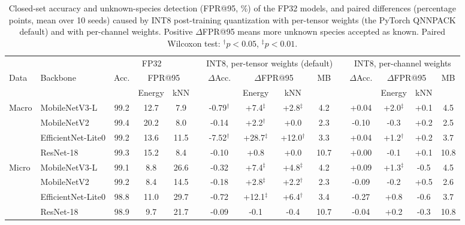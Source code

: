 \begin{table}[t]
\centering
\caption{Closed-set accuracy and unknown-species detection (FPR@95, \%) of the FP32 models, and paired differences (percentage points, mean over 10 seeds) caused by INT8 post-training quantization with per-tensor weights (the PyTorch QNNPACK default) and with per-channel weights. Positive $\Delta$FPR@95 means more unknown species accepted as known. Paired Wilcoxon test: $^{\dagger}p<0.05$, $^{\ddagger}p<0.01$.}
\label{tab:main}
\setlength{\tabcolsep}{3.2pt}
\footnotesize
\begin{tabular}{ll ccc c cccc c cccc}
\toprule
 & & \multicolumn{3}{c}{FP32} & & \multicolumn{4}{c}{INT8, per-tensor weights (default)} & & \multicolumn{4}{c}{INT8, per-channel weights} \\
\cmidrule(lr){3-5}\cmidrule(lr){7-10}\cmidrule(lr){12-15}
Data & Backbone & Acc. & \multicolumn{2}{c}{FPR@95} & & $\Delta$Acc. & \multicolumn{2}{c}{$\Delta$FPR@95} & MB & & $\Delta$Acc. & \multicolumn{2}{c}{$\Delta$FPR@95} & MB \\
 & & & Energy & kNN & & & Energy & kNN & & & & Energy & kNN & \\
\midrule
Macro & MobileNetV3-L & 99.2 & 12.7 & 7.9 &  & -0.79$^{\dagger}$ & +7.4$^{\ddagger}$ & +2.8$^{\ddagger}$ & 4.2 &  & +0.04 & +2.0$^{\ddagger}$ & +0.1 & 4.5 \\
 & MobileNetV2 & 99.4 & 20.2 & 8.0 &  & -0.14 & +2.2$^{\dagger}$ & +0.0 & 2.3 &  & -0.10 & -0.3 & +0.2 & 2.5 \\
 & EfficientNet-Lite0 & 99.2 & 13.6 & 11.5 &  & -7.52$^{\dagger}$ & +28.7$^{\ddagger}$ & +12.0$^{\dagger}$ & 3.3 &  & +0.04 & +1.2$^{\dagger}$ & +0.2 & 3.7 \\
 & ResNet-18 & 99.3 & 15.2 & 8.4 &  & -0.10 & +0.8 & +0.0 & 10.7 &  & +0.00 & -0.1 & +0.1 & 10.8 \\
\midrule
Micro & MobileNetV3-L & 99.1 & 8.8 & 26.6 &  & -0.32 & +7.4$^{\ddagger}$ & +4.8$^{\ddagger}$ & 4.2 &  & +0.09 & +1.3$^{\ddagger}$ & -0.5 & 4.5 \\
 & MobileNetV2 & 99.2 & 8.4 & 14.5 &  & -0.18 & +2.8$^{\ddagger}$ & +2.2$^{\dagger}$ & 2.3 &  & -0.09 & -0.2 & +0.5 & 2.6 \\
 & EfficientNet-Lite0 & 98.8 & 11.0 & 29.7 &  & -0.72 & +12.1$^{\ddagger}$ & +6.4$^{\dagger}$ & 3.4 &  & -0.27 & +0.8 & -0.6 & 3.7 \\
 & ResNet-18 & 98.9 & 9.7 & 21.7 &  & -0.09 & -0.1 & -0.4 & 10.7 &  & -0.04 & +0.2 & -0.3 & 10.8 \\
\bottomrule
\end{tabular}
\end{table}